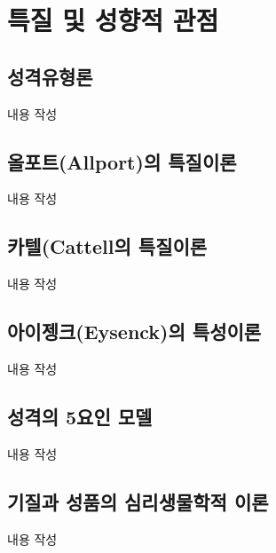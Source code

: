\section{특질 및 성향적 관점}

\subsection{성격유형론}
내용 작성

\subsection{올포트(Allport)의 특질이론}
내용 작성

\subsection{카텔(Cattell의 특질이론}
내용 작성

\subsection{아이젱크(Eysenck)의 특성이론}
내용 작성

\subsection{성격의 5요인 모델}
내용 작성

\subsection{기질과 성품의 심리생물학적 이론}
내용 작성
